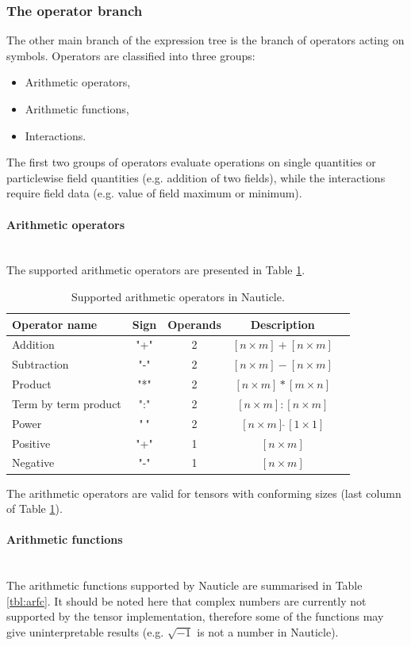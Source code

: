 \documentclass[a4paper,12pt,openany]{book}
\newcommand{\myparagraph}[1]{\paragraph{#1}\mbox{}\\}
\theoremstyle{break}
\begin{document}
\subsubsection{The operator branch}
The other main branch of the expression tree is the branch of operators acting on symbols. Operators are classified into three groups:
\begin{itemize}
  \item Arithmetic operators,
  \item Arithmetic functions,
  \item Interactions.
\end{itemize}
The first two groups of operators evaluate operations on single quantities or particlewise field quantities (e.g. addition of two fields), while the interactions require field data (e.g. value of field maximum or minimum).
\myparagraph{Arithmetic operators}
The supported arithmetic operators are presented in Table \ref{tbl:arop}.
\begin{table}
\begin{center}
\caption{Supported arithmetic operators in Nauticle.}\label{tbl:arop}
\begin{tabular}{ l c c c c }
\toprule[1.5pt]
\bf Operator name & \bf Sign & \bf Operands & \bf Description\\ 
\midrule
Addition & "+" & 2 & $[n \times m] + [n \times m]$\\ 
Subtraction & "-" & 2 & $[n \times m] - [n \times m]$\\ 
Product & "*" & 2 & $[n \times m] * [m \times n]$\\ 
Term by term product & ":" & 2 & $[n \times m] : [n \times m]$\\ 
Power & "$\hat{\ }$" & 2 & $[n \times m] \hat{\ } [1 \times 1]$\\ 
Positive & "+" & 1 & $[n \times m]$\\ 
Negative & "-" & 1 & $[n \times m]$\\ 
\bottomrule[1.25pt]
\end{tabular}
\end{center}
\end{table}
The arithmetic operators are valid for tensors with conforming sizes (last column of Table \ref{tbl:arop}).
\myparagraph{Arithmetic functions}
The arithmetic functions supported by Nauticle are summarised in Table \ref{tbl:arfc}. It should be noted here that complex numbers are currently not supported by the tensor implementation, therefore some of the functions may give uninterpretable results (e.g. $\sqrt{-1}$ is not a number in Nauticle).
\end{document}
